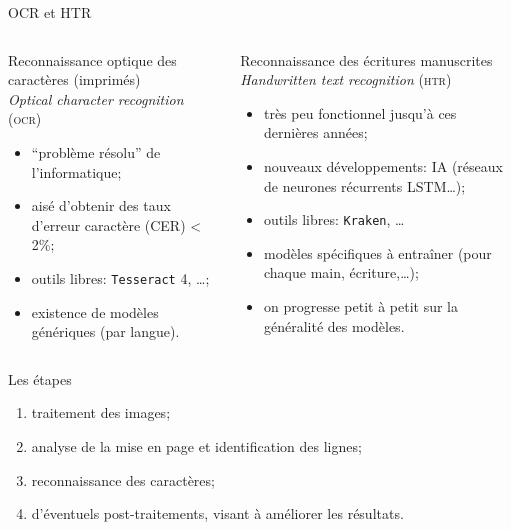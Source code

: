 \documentclass[10pt, compress,urlcolor=blue]{beamer}
\begin{document}
\begin{frame}{OCR et HTR}
    
    \begin{columns}
	\begin{column}{0.48\textwidth}
		Reconnaissance optique des caractères (imprimés)\\
		\textit{Optical character recognition} (\textsc{ocr})
		\begin{itemize}
		    \item ``problème résolu'' de l'informatique;
		    \item aisé d'obtenir des taux d'erreur caractère (CER) < 2\%;
		    \item outils libres: \texttt{Tesseract} 4, …;
		    \item existence de modèles génériques (par langue).
		\end{itemize}
	\end{column}
	\begin{column}{0.48\textwidth}
		Reconnaissance des écritures manuscrites\\
		\textit{Handwritten text recognition} (\textsc{htr})
		\begin{itemize}
		    \item très peu fonctionnel jusqu'à ces dernières années;
		    \item nouveaux développements: IA (réseaux de neurones récurrents LSTM…);
		    \item outils libres: \texttt{Kraken}, …
		    \item modèles spécifiques à entraîner (pour chaque main, écriture,…);
		    \item on progresse petit à petit sur la généralité des modèles.
		\end{itemize}
	\end{column}
\end{columns}
    
\end{frame}




\begin{frame}{Les étapes}
		\begin{enumerate}
			\item traitement des images;
			\item analyse de la mise en page et identification des lignes;
			\item reconnaissance des caractères;
			\item d'éventuels post-traitements, visant à améliorer les résultats.
		\end{enumerate}
	\end{frame}
	
\end{document}
